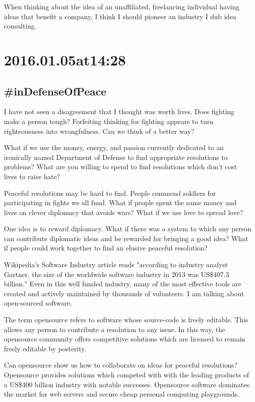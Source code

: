 \begin{enumerate}
When thinking about the idea of an unaffiliated, freelancing individual having ideas that benefit a company, I think I should pioneer an industry I dub idea consulting.

\section*{ 2016.01.05at14:28 }
\subsection*{ \#inDefenseOfPeace }

I have not seen a disagreement that I thought was worth lives. Does fighting make a person tough? Forfeiting thinking for fighting appears to turn righteousness into wrongfulness. Can we think of a better way?

What if we use the money, energy, and passion currently dedicated to an ironically named Department of Defense to find appropriate resolutions to problems? What are you willing to spend to find resolutions which don't cost lives to raise hate?

Peaceful resolutions may be hard to find. People commend soldiers for participating in fights we all fund. What if people spent the same money and lives on clever diplomacy that avoids wars? What if we use love to spread love?

One idea is to reward diplomacy. What if there was a system to which any person can contribute diplomatic ideas and be rewarded for bringing a good idea? What if people could work together to find an elusive peaceful resolution?

Wikipedia's Software Industry article reads "according to industry analyst Gartner, the size of the worldwide software industry in 2013 was US\$407.3 billion." Even in this well funded industry, many of the most effective tools are created and actively maintained by thousands of volunteers. I am talking about open-sourced software.

The term opensource refers to software whose source-code is freely editable. This allows any person to contribute a resolution to any issue. In this way, the opensource community offers competitive solutions which are licensed to remain freely editable by posterity.

Can opensource show us how to collaborate on ideas for peaceful resolutions? Opensource provides solutions which competed with with the leading products of a US\$400 billion industry with notable successes. Opensource software dominates the market for web servers and secure cheap personal computing playgrounds.


\end{enumerate}
